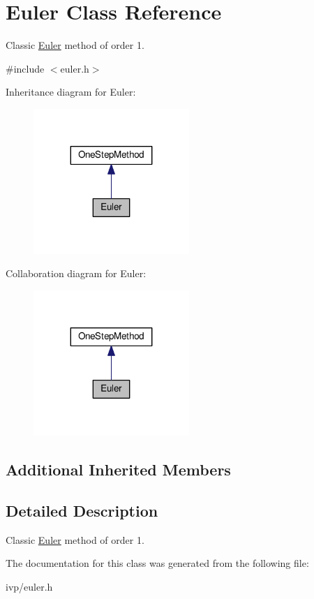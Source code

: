 \hypertarget{classEuler}{}\section{Euler Class Reference}
\label{classEuler}


Classic \hyperlink{classEuler}{Euler} method of order 1.  




{\ttfamily \#include $<$euler.\+h$>$}



Inheritance diagram for Euler\+:
\nopagebreak
\begin{figure}[H]
\begin{center}
\leavevmode
\includegraphics[width=167pt]{classEuler__inherit__graph}
\end{center}
\end{figure}


Collaboration diagram for Euler\+:
\nopagebreak
\begin{figure}[H]
\begin{center}
\leavevmode
\includegraphics[width=167pt]{classEuler__coll__graph}
\end{center}
\end{figure}
\subsection*{Additional Inherited Members}


\subsection{Detailed Description}
Classic \hyperlink{classEuler}{Euler} method of order 1. 

The documentation for this class was generated from the following file\+:\begin{DoxyCompactItemize}
\item 
ivp/euler.\+h\end{DoxyCompactItemize}

